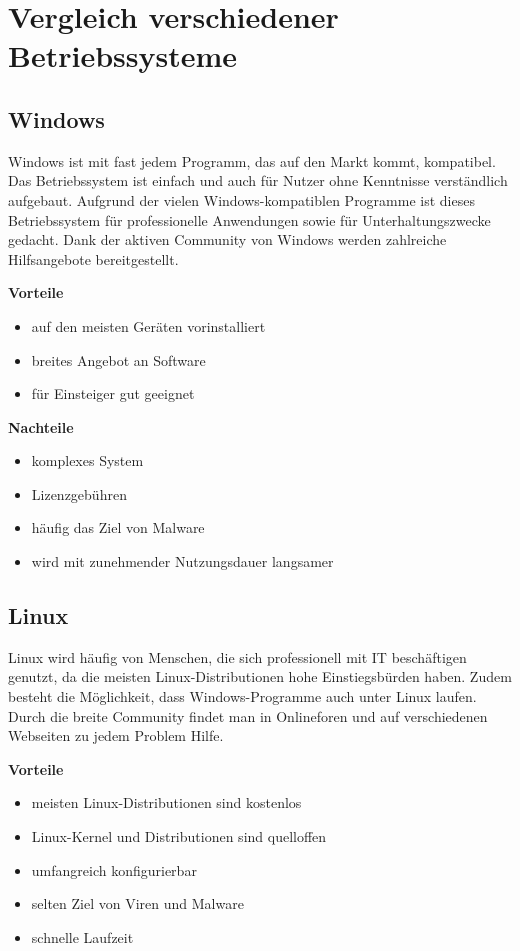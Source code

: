 \section{Vergleich verschiedener Betriebssysteme}
\subsection{Windows}
Windows ist mit fast jedem Programm, das auf den Markt kommt, kompatibel. Das Betriebssystem ist einfach und auch für Nutzer ohne Kenntnisse verständlich aufgebaut. Aufgrund der vielen Windows-kompatiblen Programme ist dieses Betriebssystem für professionelle Anwendungen sowie für Unterhaltungszwecke gedacht. Dank der aktiven Community von Windows werden zahlreiche Hilfsangebote bereitgestellt.

\textbf{Vorteile}
\begin{itemize}
	\item auf den meisten Geräten vorinstalliert
	\item breites Angebot an Software
	\item für Einsteiger gut geeignet
\end{itemize}

\textbf{Nachteile}
\begin{itemize}
	\item komplexes System
	\item Lizenzgebühren
	\item häufig das Ziel von Malware
	\item wird mit zunehmender Nutzungsdauer langsamer
\end{itemize}

\subsection{Linux}
Linux wird häufig von Menschen, die sich professionell mit IT beschäftigen genutzt, da die meisten Linux-Distributionen hohe Einstiegsbürden haben. Zudem besteht die Möglichkeit, dass Windows-Programme auch unter Linux laufen. Durch die breite Community findet man in Onlineforen und auf verschiedenen Webseiten zu jedem Problem Hilfe. \textcite{LinuxVsWindows}

\textbf{Vorteile}
\begin{itemize}
	\item meisten Linux-Distributionen sind kostenlos
	\item Linux-Kernel und Distributionen sind quelloffen
	\item umfangreich konfigurierbar
	\item selten Ziel von Viren und Malware
	\item schnelle Laufzeit
\end{itemize}

